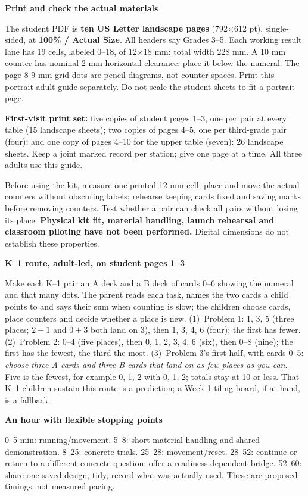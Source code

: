 \documentclass[11pt]{article}
\newcommand{\sub}[1]{\textbf{#1}\par}
\begin{document}
\sub{Print and check the actual materials}
The student PDF is \textbf{ten US Letter landscape pages} (792$\times$612 pt), single-sided, at \textbf{100\% / Actual Size}. All headers say Grades 3--5. Each working result lane has 19 cells, labeled 0--18, of 12$\times$18 mm: total width 228 mm. A 10 mm counter has nominal 2 mm horizontal clearance; place it below the numeral. The page-8 9 mm grid dots are pencil diagrams, not counter spaces. Print this portrait adult guide separately. Do not scale the student sheets to fit a portrait page.

\textbf{First-visit print set:} five copies of student pages 1--3, one per pair at every table (15 landscape sheets); two copies of pages 4--5, one per third-grade pair (four); and one copy of pages 4--10 for the upper table (seven): 26 landscape sheets. Keep a joint marked record per station; give one page at a time. All three adults use this guide.

Before using the kit, measure one printed 12 mm cell; place and move the actual counters without obscuring labels; rehearse keeping cards fixed and saving marks before removing counters. Test whether a pair can check all pairs without losing its place. \textbf{Physical kit fit, material handling, launch rehearsal and classroom piloting have not been performed.} Digital dimensions do not establish these properties.

\sub{K--1 route, adult-led, on student pages 1--3}
Make each K--1 pair an A deck and a B deck of cards 0--6 showing the numeral and that many dots. The parent reads each task, names the two cards a child points to and says their sum when counting is slow; the children choose cards, place counters and decide whether a place is new. (1)~Problem 1: 1, 3, 5 (three places; $2+1$ and $0+3$ both land on 3), then 1, 3, 4, 6 (four); the first has fewer. (2)~Problem 2: 0--4 (five places), then 0, 1, 2, 3, 4, 6 (six), then 0--8 (nine); the first has the fewest, the third the most. (3)~Problem 3's first half, with cards 0--5: \emph{choose three A cards and three B cards that land on as few places as you can}. Five is the fewest, for example 0, 1, 2 with 0, 1, 2; totals stay at 10 or less. That K--1 children sustain this route is a prediction; a Week 1 tiling board, if at hand, is a fallback.

\sub{An hour with flexible stopping points}
0--5 min: running/movement. 5--8: short material handling and shared demonstration. 8--25: concrete trials. 25--28: movement/reset. 28--52: continue or return to a different concrete question; offer a readiness-dependent bridge. 52--60: share one saved design, tidy, record what was actually used. These are proposed timings, not measured pacing.
\newpage
\end{document}
